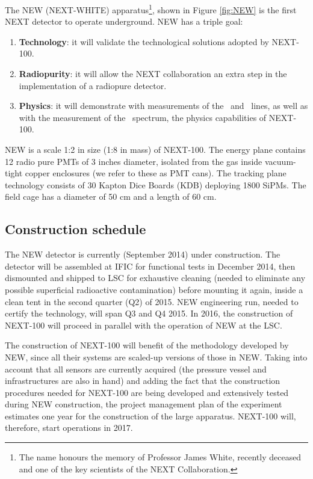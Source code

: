 \documentclass[a4paper,11pt,oneside]{article}
\begin{document}
The NEW (NEXT-WHITE) apparatus\footnote{The name honours the memory of Professor James White, recently deceased and one of the key scientists of the NEXT Collaboration.}, shown in Figure \ref{fig:NEW} is the first NEXT detector to operate underground. NEW has a triple goal:

\begin{enumerate}
\item {\bf Technology}: it will validate the technological solutions adopted by NEXT-100.
\item {\bf Radiopurity}: it will allow the NEXT collaboration an extra step in the implementation of a radiopure detector.
\item {\bf Physics}: it will demonstrate with measurements of the \BI\ and \TL\ lines, as well as with the measurement of the \bbtnu\ spectrum, the physics capabilities of NEXT-100.
\end{enumerate}

NEW is a scale 1:2 in size (1:8 in mass) of NEXT-100. The energy plane contains 12 radio pure PMTs
of 3 inches diameter, isolated from the gas inside vacuum-tight copper enclosures (we refer to these as PMT cans). The tracking plane technology consists of 30 Kapton Dice Boards (KDB) deploying 1800 SiPMs. The field cage has a diameter of 50 cm and a length of 60 cm. 

\subsection*{Construction schedule}
\label{sec.cons}

The NEW detector is currently (September 2014) under construction. The detector will be assembled at IFIC for functional tests in December 2014, then dismounted and shipped to LSC for exhaustive cleaning (needed to eliminate any possible superficial radioactive contamination) before mounting it again, inside a clean tent in the second quarter (Q2) of 2015. NEW engineering run, needed to certify the technology, will span Q3 and Q4 2015. In 2016, the construction of NEXT-100 will proceed in parallel with the operation of NEW at the LSC. 

The construction of NEXT-100 will benefit of the methodology developed by NEW, since all their systems are scaled-up versions of those in NEW. Taking into account that all sensors are currently acquired (the pressure vessel and infrastructures are also in hand) and adding the fact that the construction procedures needed for NEXT-100 are being developed and extensively tested during NEW construction, the project management plan of the experiment estimates one year for the construction of the large apparatus. NEXT-100 will, therefore, start operations in 2017.
\end{document}
